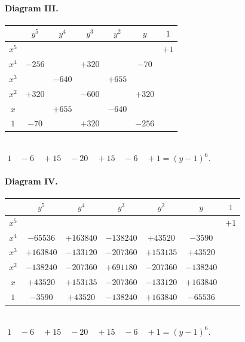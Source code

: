\documentclass[11pt]{article}
\begin{document}
\paragraph{Diagram III.}
\begin{center}
\renewcommand{\arraystretch}{1.05}
\begin{tabular}{|c|c|c|c|c|c|c|}
\hline
       & $y^5$ & $y^4$ & $y^3$ & $y^2$ & $y$ & $1$ \\
\hline
$x^5$ &        &        &        &        &       & $+1$ \\
\hline
$x^4$ & $-256$ &        & $+320$ &        & $-70$ &      \\
\hline
$x^3$ &        & $-640$ &        & $+655$ &       &      \\
\hline
$x^2$ & $+320$ &        & $-600$ &        & $+320$ & \\
\hline
$x$   &        & $+655$ &        & $-640$ &       & \\
\hline
$1$   & $-70$ &        & $+320$ &        & $-256$ & \\
\hline
\end{tabular}\\[2pt]
\(\;1\quad-6\quad+15\quad-20\quad+15\quad-6\quad+1=(y-1)^6.\)
\end{center}

\paragraph{Diagram IV.}
\begin{center}
\renewcommand{\arraystretch}{1.05}
\begin{tabular}{|c|c|c|c|c|c|c|}
\hline
       & $y^5$ & $y^4$ & $y^3$ & $y^2$ & $y$ & $1$ \\
\hline
$x^5$ &        &        &        &        &       & $+1$ \\
\hline
$x^4$ & $-65536$ & $+163840$ & $-138240$ & $+43520$ & $-3590$ & \\
\hline
$x^3$ & $+163840$ & $-133120$ & $-207360$ & $+153135$ & $+43520$ & \\
\hline
$x^2$ & $-138240$ & $-207360$ & $+691180$ & $-207360$ & $-138240$ & \\
\hline
$x$   & $+43520$ & $+153135$ & $-207360$ & $-133120$ & $+163840$ & \\
\hline
$1$   & $-3590$ & $+43520$ & $-138240$ & $+163840$ & $-65536$ & \\
\hline
\end{tabular}\\[2pt]
\(\;1\quad-6\quad+15\quad-20\quad+15\quad-6\quad+1=(y-1)^6.\)
\end{center}
\end{document}

